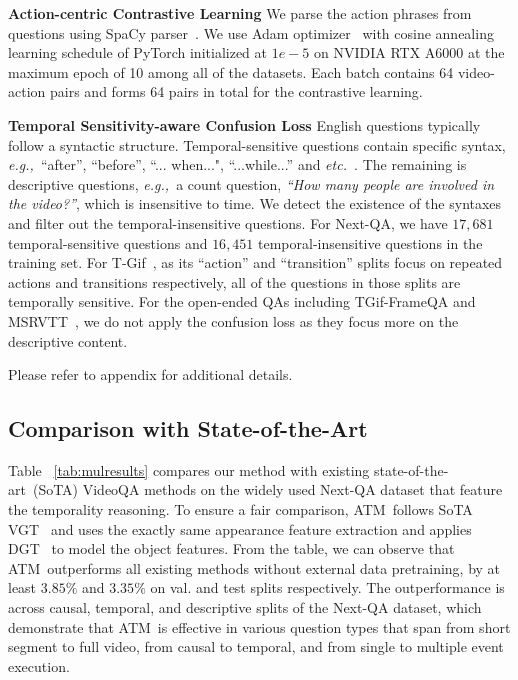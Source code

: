 \documentclass[sigconf]{acmart}
\newcommand{\methodname}{ATM~}
\newcommand{\eg}{\emph{e.g.,~}}
\newcommand{\etc}{\emph{etc.~}}
\begin{document}
\textbf{Action-centric Contrastive Learning}
We parse the action phrases from questions using SpaCy parser~\cite{spacy2}.
We use Adam optimizer~\cite{kingma2014adam} with cosine annealing learning schedule of PyTorch initialized at $1e-5$ on NVIDIA RTX A6000 at the maximum epoch of 10 among all of the datasets. 
Each batch contains 64 video-action pairs and forms 64 pairs in total for the contrastive learning. 


\textbf{Temporal Sensitivity-aware Confusion Loss}
English questions typically follow a syntactic structure. Temporal-sensitive questions contain specific syntax, \eg ``after'', ``before'', ``... when...", ``...while...'' and \etc. The remaining is descriptive questions, \eg a count question, \textit{``How many people are involved in the video?''}, which is insensitive to time. 
We detect the existence of the syntaxes and filter out the temporal-insensitive questions. 
For Next-QA, we have $17,681$ temporal-sensitive questions and $16,451$ temporal-insensitive questions in the training set.
For T-Gif~\cite{li2016tgif}, as its ``action'' and ``transition'' splits focus on repeated actions and transitions respectively, all of the questions in those splits are temporally sensitive. 
For the open-ended QAs including TGif-FrameQA and MSRVTT~\cite{xu2016msr}, we do not apply the confusion loss as they focus more on the descriptive content. 

Please refer to appendix for additional details.



\subsection{Comparison with State-of-the-Art}
Table ~\ref{tab:mulresults} compares our method with existing state-of-the-art~(SoTA) VideoQA methods on the widely used Next-QA dataset that feature the temporality reasoning. 
To ensure a fair comparison, \methodname follows SoTA VGT~\cite{xiao2022vgt} and uses the exactly same appearance feature extraction and applies DGT~\cite{xiao2022vgt} to model the object features. 
From the table, we can observe that \methodname outperforms all existing methods without external data pretraining, by at least $3.85\%$ and $3.35\%$ on val. and test splits respectively. The outperformance is across causal, temporal, and descriptive splits of the Next-QA dataset, which demonstrate that \methodname is effective in various question types that span from short segment to full video, from causal to temporal, and from single to multiple event execution. 
\end{document}
